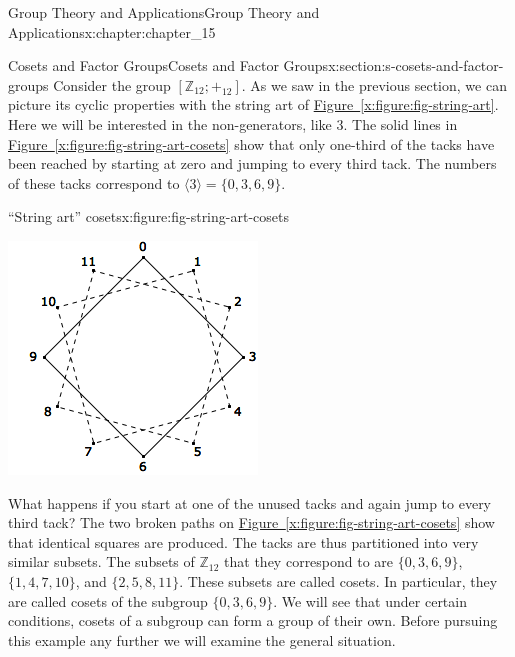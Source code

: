 \documentclass[oneside,10pt,]{book}
\newcommand{\xreffont}{\relax}
\numberwithin{equation}{section}
\begin{document}
\begin{chapterptx}{Group Theory and Applications}{}{Group Theory and Applications}{}{}{x:chapter:chapter_15}
\begin{sectionptx}{Cosets and Factor Groups}{}{Cosets and Factor Groups}{}{}{x:section:s-cosets-and-factor-groups}
%
Consider the group \(\left[\mathbb{Z}_{12};+_{12}\right]\). As we saw in the previous section, we can picture its cyclic properties with the string art of \hyperref[x:figure:fig-string-art]{Figure~{\xreffont\ref{x:figure:fig-string-art}}}. Here we will be interested in the non-generators, like 3. The solid lines in \hyperref[x:figure:fig-string-art-cosets]{Figure~{\xreffont\ref{x:figure:fig-string-art-cosets}}} show that only one-third of the tacks have been reached by starting at zero and jumping to every third tack. The numbers of these tacks correspond to \(\langle 3 \rangle = \{0, 3, 6, 9\}\).%
\begin{figureptx}{``String art'' cosets}{x:figure:fig-string-art-cosets}{}%
\begin{image}{0.15}{0.7}{0.15}%
\includegraphics[width=\linewidth]{images/fig-string-art-cosets.png}
\end{image}%
\tcblower
\end{figureptx}%
What happens if you start at one of the unused tacks and again jump to every third tack? The two broken paths on \hyperref[x:figure:fig-string-art-cosets]{Figure~{\xreffont\ref{x:figure:fig-string-art-cosets}}} show that identical squares are produced. The tacks are thus partitioned into very similar subsets. The subsets of \(\mathbb{Z}_{12}\) that they correspond to are \(\{0,
3, 6, 9\}\), \(\{1, 4, 7, 10\}\), and \(\{2, 5, 8, 11\}\). These subsets are called cosets. In particular, they are called cosets of the subgroup \(\{0, 3, 6, 9\}\). We will see that under certain conditions, cosets of a subgroup can form a group of their own. Before pursuing this example any further we will examine the general situation.%

\end{sectionptx}
\end{chapterptx}
\end{document}
